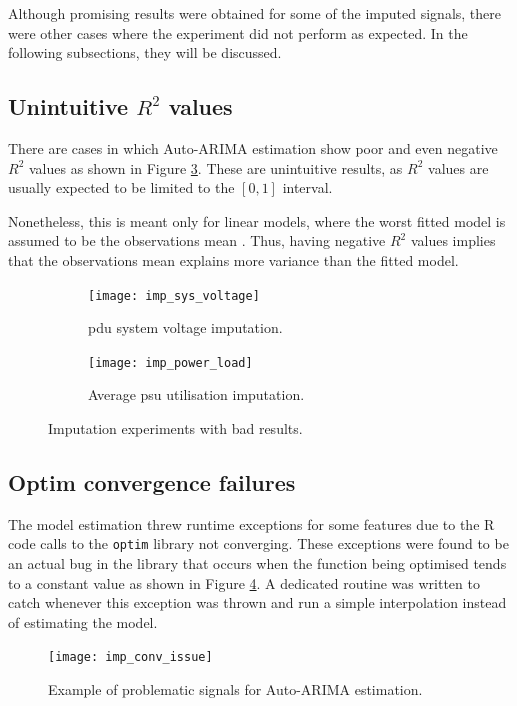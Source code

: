 Although promising results were obtained for some of the imputed signals, there were other cases where the experiment did not perform as expected. In the following subsections, they will be discussed.

\subsection{Unintuitive $R^2$ values}

There are cases in which Auto-ARIMA estimation show poor and even negative $R^2$ values as shown in Figure \ref{fig:imp_exp_issue}. These are unintuitive results, as $R^2$ values are usually expected to be limited to the $[0,1]$ interval. 

Nonetheless, this is meant only for linear models, where the worst fitted model is assumed to be the observations mean \cite{wackerly}. Thus, having negative $R^2$ values implies that the observations mean explains more variance than the fitted model.

\begin{figure}[hptb]
	\centering
	\begin{subfigure}{.48\textwidth}
		\texttt{[image: imp\_sys\_voltage]}
		\caption{\ac{pdu} system voltage imputation.}
		\label{fig:imp_pdu_sys_voltage}
	\end{subfigure}%
	\hfill
	\begin{subfigure}{.48\textwidth}
		\texttt{[image: imp\_power\_load]}
		\caption{Average \ac{psu} utilisation imputation.}
		\label{fig:imp_psu_load}
	\end{subfigure}
	\caption{Imputation experiments with bad results.}
	\label{fig:imp_exp_issue}
\end{figure}

\subsection{Optim convergence failures}

The model estimation threw runtime exceptions for some features due to the R code calls to the \texttt{optim} library not converging. These exceptions were found to be an actual bug in the library that occurs when the function being optimised tends to a constant value as shown in Figure \ref{fig:imp_conv_issue}. A dedicated routine was written to catch whenever this exception was thrown and run a simple interpolation instead of estimating the model.

\begin{figure}[H]
	\centering
	\texttt{[image: imp\_conv\_issue]}
	\caption{Example of problematic signals for Auto-ARIMA estimation.}
	\label{fig:imp_conv_issue}
\end{figure}

